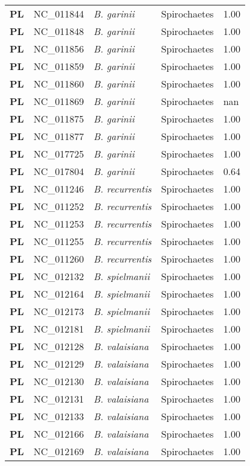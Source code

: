 \begin{adjustwidth}{-3cm}{2cm}
{\begin{supertabular}{>{\bfseries}l|p{0.1\textwidth}p{0.14\textwidth}l|l}
PL & NC\_011844 & \textit{B. garinii} & Spirochaetes & 1.00\\
PL & NC\_011848 & \textit{B. garinii} & Spirochaetes & 1.00\\
PL & NC\_011856 & \textit{B. garinii} & Spirochaetes & 1.00\\
PL & NC\_011859 & \textit{B. garinii} & Spirochaetes & 1.00\\
PL & NC\_011860 & \textit{B. garinii} & Spirochaetes & 1.00\\
PL & NC\_011869 & \textit{B. garinii} & Spirochaetes & nan\\
PL & NC\_011875 & \textit{B. garinii} & Spirochaetes & 1.00\\
PL & NC\_011877 & \textit{B. garinii} & Spirochaetes & 1.00\\
PL & NC\_017725 & \textit{B. garinii} & Spirochaetes & 1.00\\
PL & NC\_017804 & \textit{B. garinii} & Spirochaetes & 0.64\\
PL & NC\_011246 & \textit{B. recurrentis} & Spirochaetes & 1.00\\
PL & NC\_011252 & \textit{B. recurrentis} & Spirochaetes & 1.00\\
PL & NC\_011253 & \textit{B. recurrentis} & Spirochaetes & 1.00\\
PL & NC\_011255 & \textit{B. recurrentis} & Spirochaetes & 1.00\\
PL & NC\_011260 & \textit{B. recurrentis} & Spirochaetes & 1.00\\
PL & NC\_012132 & \textit{B. spielmanii} & Spirochaetes & 1.00\\
PL & NC\_012164 & \textit{B. spielmanii} & Spirochaetes & 1.00\\
PL & NC\_012173 & \textit{B. spielmanii} & Spirochaetes & 1.00\\
PL & NC\_012181 & \textit{B. spielmanii} & Spirochaetes & 1.00\\
PL & NC\_012128 & \textit{B. valaisiana} & Spirochaetes & 1.00\\
PL & NC\_012129 & \textit{B. valaisiana} & Spirochaetes & 1.00\\
PL & NC\_012130 & \textit{B. valaisiana} & Spirochaetes & 1.00\\
PL & NC\_012131 & \textit{B. valaisiana} & Spirochaetes & 1.00\\
PL & NC\_012133 & \textit{B. valaisiana} & Spirochaetes & 1.00\\
PL & NC\_012166 & \textit{B. valaisiana} & Spirochaetes & 1.00\\
PL & NC\_012169 & \textit{B. valaisiana} & Spirochaetes & 1.00\\

\end{supertabular}}
\end{adjustwidth}
